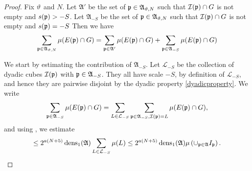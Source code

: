 \begin{proof}
\leanok
{Fix ${\vartheta}$ and $N$. Let
$\mathfrak{A}'$ be the set of ${\mathfrak p}\in\mathfrak{A}_{{\vartheta},N}$ such that ${\mathcal{I}}({\mathfrak p})\cap G$ is not empty and $s({\mathfrak p}) > -S$.
Let $\mathfrak{A}_{-S}$ be the set of ${\mathfrak p}\in\mathfrak{A}_{{\vartheta},N}$ such that ${\mathcal{I}}({\mathfrak p})\cap G$ is not empty and $s({\mathfrak p}) = -S$ }
Then we have
\begin{equation*}
    \sum_{{\mathfrak p}\in\mathfrak{A}_{{\vartheta},N}}\mu(E({\mathfrak p})\cap G) =
    \sum_{{\mathfrak p}\in\mathfrak{A}'}\mu(E({\mathfrak p})\cap G) + \sum_{{\mathfrak p}\in\mathfrak{A}_{-S}}\mu(E({\mathfrak p})\cap G)
\end{equation*}

We start by estimating the contribution of $\mathfrak{A}_{-S}$. Let $\mathcal{L}_{-S}$ be the
collection of dyadic cubes ${\mathcal{I}}({\mathfrak p})$ with ${\mathfrak p} \in \mathfrak{A}_{-S}$. They all have scale $-S$,
by definition of $\mathcal{L}_{-S}$, and hence they are pairwise disjoint by the dyadic property
\eqref{dyadicproperty}. We write
\[
    \sum_{{\mathfrak p}\in\mathfrak{A}_{-S}}\mu(E({\mathfrak p})\cap G)
    = \sum_{L \in \mathcal{L}_{-S}} \sum_{{\mathfrak p}\in\mathfrak{A}_{-S}, {\mathcal{I}}({\mathfrak p}) = L} \mu(E({\mathfrak p})\cap G),
\]
and using , we estimate
\begin{equation}\label{eq_minus_S}
    \le 2^{a(N+5)} \operatorname{\operatorname{dens}}_1(\mathfrak{A}) \sum_{L \in \mathcal{L}_{-S}} \mu(L)
    \le 2^{a(N+5)} \operatorname{\operatorname{dens}}_1(\mathfrak{A}) \mu\left(\cup_{{\mathfrak p}\in\mathfrak{A}}I_{{\mathfrak p}}\right).
\end{equation}


\end{proof}
